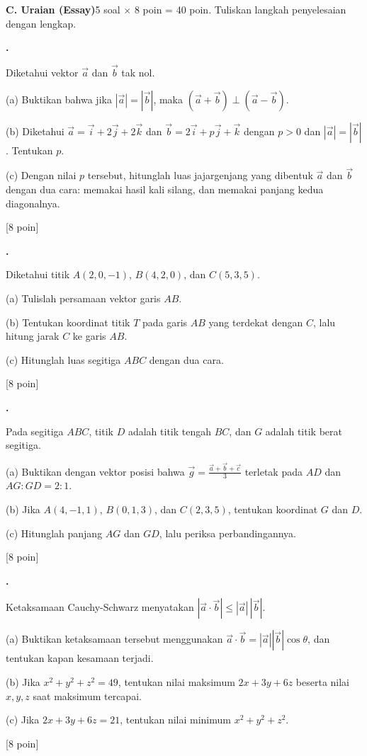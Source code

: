 \documentclass[a4paper,11pt]{article}
\newcommand{\dis}{\displaystyle}
\newcounter{no}
\newcommand{\bagian}[2]{\par\Needspace{6\baselineskip}\vspace{1.0em}\noindent
  \begin{tcolorbox}[colback=navy,colframe=navy,coltext=white,boxrule=0pt,arc=2pt,left=6pt,right=6pt,top=3pt,bottom=3pt]
  \textbf{#1}\hfill{\small #2}\end{tcolorbox}\setcounter{no}{0}\par\vspace{-0.3em}}
\newcommand{\soal}[2]{\par\vspace{0.75em}\stepcounter{no}\noindent
  \begin{minipage}[t]{1.8em}\textbf{\theno.}\end{minipage}%
  \begin{minipage}[t]{\dimexpr\linewidth-1.8em\relax}#1\par\vspace{0.35em}#2\end{minipage}\par}
\newcommand{\poin}[1]{\hfill{\small\color{navy}[#1 poin]}}
\begin{document}
\bagian{C. Uraian (Essay)}{5 soal $\times$ 8 poin = 40 poin. Tuliskan langkah penyelesaian dengan lengkap.}
\soal{Diketahui vektor $\vec a$ dan $\vec b$ tak nol.\par\smallskip\hspace*{0.3em}(a) Buktikan bahwa jika $|\vec a|=|\vec b|$, maka $(\vec a+\vec b)\perp(\vec a-\vec b)$.\par\hspace*{0.3em}(b) Diketahui $\vec a=\vec i+2\vec j+2\vec k$ dan $\vec b=2\vec i+p\vec j+\vec k$ dengan $p>0$ dan $|\vec a|=|\vec b|$. Tentukan $p$.\par\hspace*{0.3em}(c) Dengan nilai $p$ tersebut, hitunglah luas jajargenjang yang dibentuk $\vec a$ dan $\vec b$ dengan dua cara: memakai hasil kali silang, dan memakai panjang kedua diagonalnya.}{\poin{8}}
\soal{Diketahui titik $A(2,0,-1)$, $B(4,2,0)$, dan $C(5,3,5)$.\par\smallskip\hspace*{0.3em}(a) Tulislah persamaan vektor garis $AB$.\par\hspace*{0.3em}(b) Tentukan koordinat titik $T$ pada garis $AB$ yang terdekat dengan $C$, lalu hitung jarak $C$ ke garis $AB$.\par\hspace*{0.3em}(c) Hitunglah luas segitiga $ABC$ dengan dua cara.}{\poin{8}}
\soal{Pada segitiga $ABC$, titik $D$ adalah titik tengah $BC$, dan $G$ adalah titik berat segitiga.\par\smallskip\hspace*{0.3em}(a) Buktikan dengan vektor posisi bahwa $\vec g=\dis\frac{\vec a+\vec b+\vec c}{3}$ terletak pada $AD$ dan $AG:GD=2:1$.\par\hspace*{0.3em}(b) Jika $A(4,-1,1)$, $B(0,1,3)$, dan $C(2,3,5)$, tentukan koordinat $G$ dan $D$.\par\hspace*{0.3em}(c) Hitunglah panjang $AG$ dan $GD$, lalu periksa perbandingannya.}{\poin{8}}
\soal{Ketaksamaan Cauchy-Schwarz menyatakan $|\vec a\cdot\vec b|\le|\vec a|\,|\vec b|$.\par\smallskip\hspace*{0.3em}(a) Buktikan ketaksamaan tersebut menggunakan $\vec a\cdot\vec b=|\vec a||\vec b|\cos\theta$, dan tentukan kapan kesamaan terjadi.\par\hspace*{0.3em}(b) Jika $x^{2}+y^{2}+z^{2}=49$, tentukan nilai maksimum $2x+3y+6z$ beserta nilai $x,y,z$ saat maksimum tercapai.\par\hspace*{0.3em}(c) Jika $2x+3y+6z=21$, tentukan nilai minimum $x^{2}+y^{2}+z^{2}$.}{\poin{8}}
\end{document}
